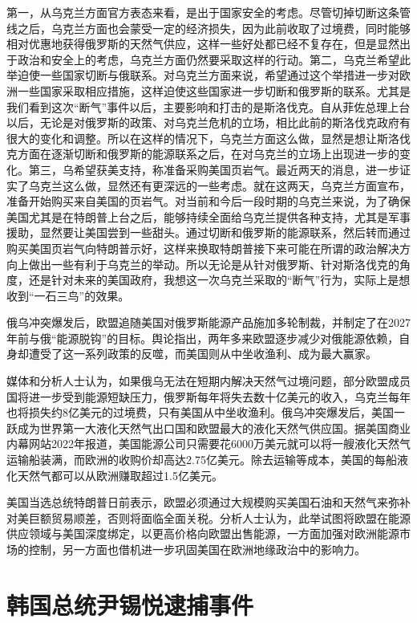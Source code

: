 第一，从乌克兰方面官方表态来看，是出于国家安全的考虑。尽管切掉切断这条管线之后，乌克兰方面也会蒙受一定的经济损失，因为此前收取了过境费，同时能够相对优惠地获得俄罗斯的天然气供应，这样一些好处都已经不复存在，但是显然出于政治和安全上的考虑，乌克兰方面仍然要采取这样的行动。第二，乌克兰希望此举迫使一些国家切断与俄联系。对乌克兰方面来说，希望通过这个举措进一步对欧洲一些国家采取相应措施，这样迫使这些国家进一步切断和俄罗斯的联系。尤其是我们看到这次“断气”事件以后，主要影响和打击的是斯洛伐克。自从菲佐总理上台以后，无论是对俄罗斯的政策、对乌克兰危机的立场，相比此前的斯洛伐克政府有很大的变化和调整。所以在这样的情况下，乌克兰方面这么做，显然是想让斯洛伐克方面在逐渐切断和俄罗斯的能源联系之后，在对乌克兰的立场上出现进一步的变化。第三，乌希望获美支持，称准备采购美国页岩气。最近两天的消息，进一步证实了乌克兰这么做，显然还有更深远的一些考虑。就在这两天，乌克兰方面宣布，准备开始购买来自美国的页岩气。对当前和今后一段时期的乌克兰来说，为了确保美国尤其是在特朗普上台之后，能够持续全面给乌克兰提供各种支持，尤其是军事援助，显然要让美国尝到一些甜头。通过切断和俄罗斯的能源联系，然后转而通过购买美国页岩气向特朗普示好，这样来换取特朗普接下来可能在所谓的政治解决方向上做出一些有利于乌克兰的举动。所以无论是从针对俄罗斯、针对斯洛伐克的角度，还是针对未来的美国政府，我想这一次乌克兰采取的“断气”行为，实际上是想收到“一石三鸟”的效果。

俄乌冲突爆发后，欧盟追随美国对俄罗斯能源产品施加多轮制裁，并制定了在2027年前与俄“能源脱钩”的目标。舆论指出，两年多来欧盟逐步减少对俄能源依赖，自身却遭受了这一系列政策的反噬，而美国则从中坐收渔利、成为最大赢家。

媒体和分析人士认为，如果俄乌无法在短期内解决天然气过境问题，部分欧盟成员国将进一步受到能源短缺压力，俄罗斯每年将失去数十亿美元的收入，乌克兰每年也将损失约8亿美元的过境费，只有美国从中坐收渔利。俄乌冲突爆发后，美国一跃成为世界第一大液化天然气出口国和欧盟最大的液化天然气供应国。据美国商业内幕网站2022年报道，美国能源公司只需要花6000万美元就可以将一艘液化天然气运输船装满，而欧洲的收购价却高达2.75亿美元。除去运输等成本，美国的每船液化天然气都可以从欧洲赚取超过1.5亿美元。

美国当选总统特朗普日前表示，欧盟必须通过大规模购买美国石油和天然气来弥补对美巨额贸易顺差，否则将面临全面关税。分析人士认为，此举试图将欧盟在能源供应领域与美国深度绑定，以更高价格向欧盟出售能源，一方面加强对欧洲能源市场的控制，另一方面也借机进一步巩固美国在欧洲地缘政治中的影响力。

\section{韩国总统尹锡悦逮捕事件}

